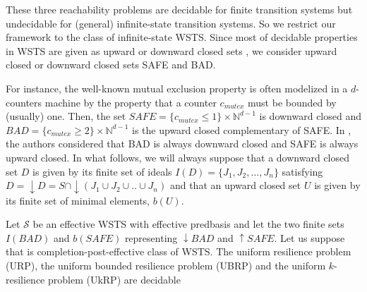 These three reachability problems are decidable for finite transition systems but undecidable for (general) infinite-state transition systems. 
So we restrict our framework to the class of infinite-state WSTS. Since most of decidable properties in WSTS are given as upward or downward closed sets \cite{DBLP:journals/iandc/AbdullaCJT00, DBLP:journals/tcs/FinkelS01}, we consider upward closed or downward closed sets SAFE and BAD.

For instance, the well-known mutual exclusion property is often modelized in a $d$-counters machine by the property that a counter $c_{mutex}$ must be bounded by (usually) one. Then, the set $SAFE =  \{c_{mutex} \leq 1\} \times \mathbb{N}^{d-1}$ is downward closed and $BAD =\{c_{mutex} \geq 2\} \times  \mathbb{N}^{d-1} $ is the upward closed complementary of SAFE. In \cite{DBLP:conf/gg/Ozkan22}, the authors considered that BAD is always downward closed and SAFE is always upward closed.
%		
In what follows, we will always suppose that a downward closed set $D$ is given by its finite set of ideals $I(D)=\{J_1, J_2,...,J_n\}$ satisfying $D=\downarrow D = S \cap \downarrow (J_1 \cup J_2 \cup..\cup J_n)$ and that an upward closed set $U$ is given by its finite set of minimal elements, $b(U)$.




\begin{proposition}\label{down-up}
Let $\mathscr{S}$ be an effective WSTS with effective predbasis and let the two finite sets $I(BAD)$ and  $b(SAFE)$ representing $\downarrow BAD$ and $\uparrow SAFE$. Let us suppose that is completion-post-effective class of WSTS.
The uniform resilience problem (URP), the uniform bounded resilience problem (UBRP) and the uniform $k$-resilience problem (UkRP) are decidable
\end{proposition}

